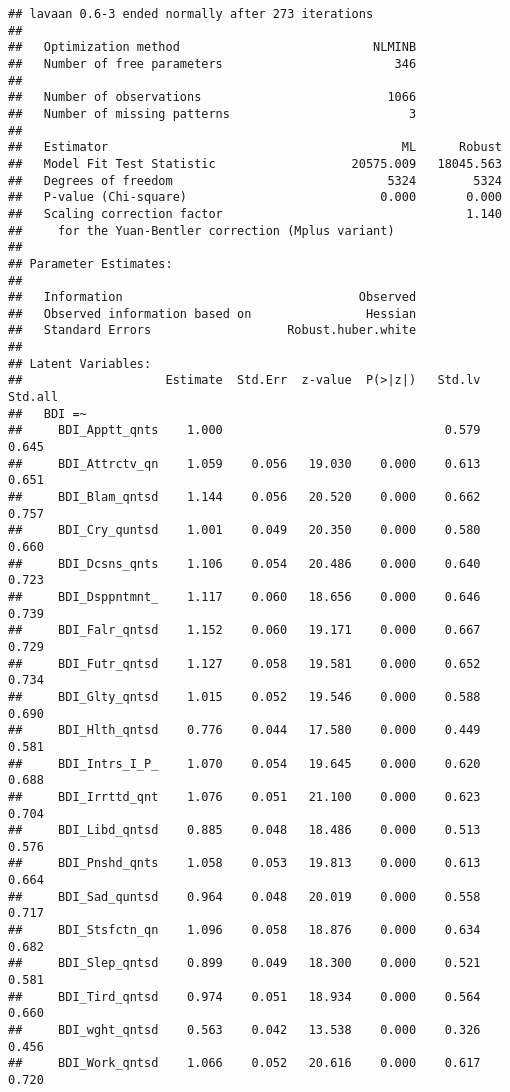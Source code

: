 \documentclass[]{article}
\begin{document}
\begin{verbatim}
## lavaan 0.6-3 ended normally after 273 iterations
## 
##   Optimization method                           NLMINB
##   Number of free parameters                        346
## 
##   Number of observations                          1066
##   Number of missing patterns                         3
## 
##   Estimator                                         ML      Robust
##   Model Fit Test Statistic                   20575.009   18045.563
##   Degrees of freedom                              5324        5324
##   P-value (Chi-square)                           0.000       0.000
##   Scaling correction factor                                  1.140
##     for the Yuan-Bentler correction (Mplus variant)
## 
## Parameter Estimates:
## 
##   Information                                 Observed
##   Observed information based on                Hessian
##   Standard Errors                   Robust.huber.white
## 
## Latent Variables:
##                    Estimate  Std.Err  z-value  P(>|z|)   Std.lv  Std.all
##   BDI =~                                                                
##     BDI_Apptt_qnts    1.000                               0.579    0.645
##     BDI_Attrctv_qn    1.059    0.056   19.030    0.000    0.613    0.651
##     BDI_Blam_qntsd    1.144    0.056   20.520    0.000    0.662    0.757
##     BDI_Cry_quntsd    1.001    0.049   20.350    0.000    0.580    0.660
##     BDI_Dcsns_qnts    1.106    0.054   20.486    0.000    0.640    0.723
##     BDI_Dsppntmnt_    1.117    0.060   18.656    0.000    0.646    0.739
##     BDI_Falr_qntsd    1.152    0.060   19.171    0.000    0.667    0.729
##     BDI_Futr_qntsd    1.127    0.058   19.581    0.000    0.652    0.734
##     BDI_Glty_qntsd    1.015    0.052   19.546    0.000    0.588    0.690
##     BDI_Hlth_qntsd    0.776    0.044   17.580    0.000    0.449    0.581
##     BDI_Intrs_I_P_    1.070    0.054   19.645    0.000    0.620    0.688
##     BDI_Irrttd_qnt    1.076    0.051   21.100    0.000    0.623    0.704
##     BDI_Libd_qntsd    0.885    0.048   18.486    0.000    0.513    0.576
##     BDI_Pnshd_qnts    1.058    0.053   19.813    0.000    0.613    0.664
##     BDI_Sad_quntsd    0.964    0.048   20.019    0.000    0.558    0.717
##     BDI_Stsfctn_qn    1.096    0.058   18.876    0.000    0.634    0.682
##     BDI_Slep_qntsd    0.899    0.049   18.300    0.000    0.521    0.581
##     BDI_Tird_qntsd    0.974    0.051   18.934    0.000    0.564    0.660
##     BDI_wght_qntsd    0.563    0.042   13.538    0.000    0.326    0.456
##     BDI_Work_qntsd    1.066    0.052   20.616    0.000    0.617    0.720

\end{verbatim}
\end{document}
